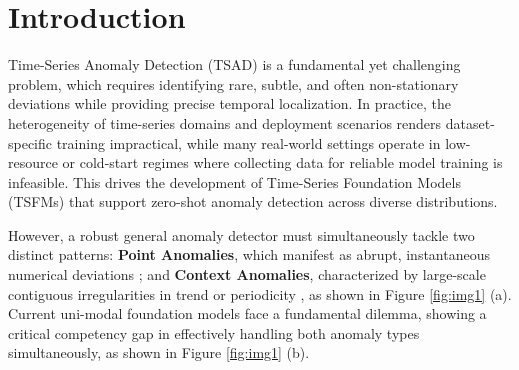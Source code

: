 \documentclass{article}
\theoremstyle{plain}
\theoremstyle{definition}
\theoremstyle{remark}
\begin{document}
\begin{abstract}
Time-series anomaly detection (TSAD) requires identifying both immediate Point Anomalies and long-range Context Anomalies. However, existing foundation models face a fundamental trade-off: 1D temporal models provide fine-grained pointwise localization but lack a global contextual perspective, while 2D vision-based models capture global patterns but suffer from information bottlenecks due to a lack of temporal alignment and coarse-grained pointwise detection. To resolve this dilemma, we propose VETime, the first TSAD framework that unifies temporal and visual modalities through fine-grained visual-temporal alignment and dynamic fusion. VETime introduces a Reversible Image Conversion and a Patch-Level Temporal Alignment module to establish a shared visual-temporal timeline, preserving discriminative details while maintaining temporal sensitivity. Furthermore, we design an Anomaly Window Contrastive Learning mechanism and a Task-Adaptive Multi-Modal Fusion to adaptively integrate the complementary perceptual strengths of both modalities. Extensive experiments demonstrate that VETime significantly outperforms state-of-the-art models in zero-shot scenarios, achieving superior localization precision with lower computational overhead than current vision-based approaches.
Code available at: https://github.com/yyyangcoder/VETime.
 
\end{abstract}
\section{Introduction}
Time-Series Anomaly Detection (TSAD) is a fundamental yet challenging problem, which requires identifying rare, subtle, and often non-stationary deviations while providing precise temporal localization.
In practice, the heterogeneity of time-series domains and deployment scenarios renders dataset-specific training impractical, while many real-world settings operate in low-resource or cold-start regimes where collecting data for reliable model training is
infeasible. This drives the development of Time-Series Foundation Models (TSFMs) that support zero-shot anomaly detection across diverse distributions. 

However, a robust general anomaly detector must simultaneously tackle two distinct patterns: \textbf{Point Anomalies}, which manifest as abrupt, instantaneous numerical deviations \cite{shentu2024dada}; and \textbf{Context Anomalies}, characterized by large-scale contiguous irregularities in trend or periodicity \cite{he2025harnessing}, as shown in Figure \ref{fig:img1} (a). Current uni-modal foundation models face a fundamental dilemma, showing a critical competency gap in effectively handling both anomaly types simultaneously, as shown in Figure \ref{fig:img1} (b).
\end{document}
